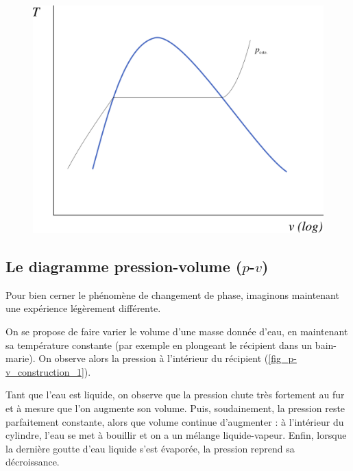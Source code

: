 		\begin{figure}
			\begin{center}
				\includegraphics[width=\didacticpvdiagramwidth]{images/tv_liquidevapeur.png}
			\end{center}
			\label{fig_t-v_eau}
		\end{figure}


	\subsection{Le diagramme pression-volume ($p$-$v$)}
	\label{ch_lv_bain_marie}

		Pour bien cerner le phénomène de changement de phase, imaginons maintenant une expérience légèrement différente. 
		
		On se propose de faire varier le volume d’une masse donnée d’eau, en maintenant sa température constante (par exemple en plongeant le récipient dans un bain-marie). On observe alors la pression à l’intérieur du récipient (\cref{fig_p-v_construction_1}).
		
		Tant que l’eau est liquide, on observe que la pression chute très fortement au fur et à mesure que l’on augmente son volume. Puis, soudainement, la pression reste parfaitement constante, alors que volume continue d’augmenter : à l’intérieur du cylindre, l’eau se met à bouillir et on a un mélange liquide-vapeur. Enfin, lorsque la dernière goutte d’eau liquide s’est évaporée, la pression reprend sa décroissance.

